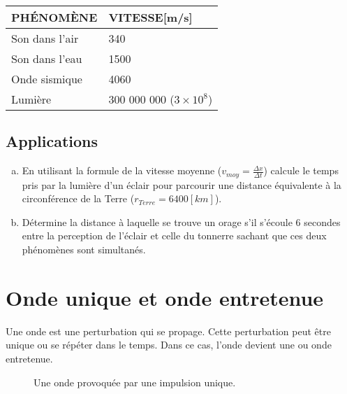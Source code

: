\begin{center}
    \begin{tabularx}{.8 \textwidth}{m{} X}
        \hline
        \uppercase{Phénomène} & \uppercase{Vitesse}[m/s]        \\
        \hline
        Son dans l'air        & 340                             \\
        \hline
        Son dans l'eau        & 1500                            \\
        \hline
        Onde sismique         & 4060                            \\
        \hline
        Lumière               & 300 000 000 (\(3 \times 10^8\)) \\
        \hline
    \end{tabularx}
\end{center}


\subsection{Applications}
\begin{enumerate}[a)]
    \item En utilisant la formule de la vitesse moyenne (\(v_{moy}=\frac{\Delta x}{\Delta t}\)) calcule le temps pris par la lumière d'un éclair pour parcourir une distance équivalente à la circonférence de la Terre (\(r_{Terre} = 6400 [ km]\)).
    \item Détermine la distance à laquelle se trouve un orage s'il s'écoule 6 secondes entre la perception de l'éclair et celle du tonnerre sachant que ces deux phénomènes sont simultanés.
\end{enumerate}

\newpage

\section{Onde unique et onde entretenue}
\label{Onde unique et onde entretenue}
Une onde est une perturbation qui se propage. Cette perturbation peut être unique ou se répéter dans le temps. Dans ce cas, l'onde devient une  ou onde entretenue.

\begin{figure}[ht!]
    \centering
    
    \caption{Une onde provoquée par une impulsion unique.}
    \label{onde_unique}
\end{figure}

\newpage

